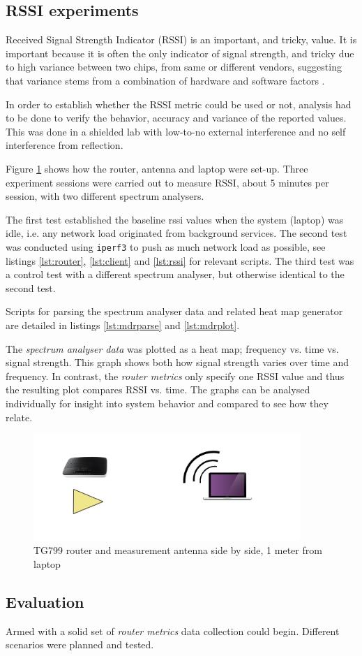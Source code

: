 \subsection{RSSI experiments}

Received Signal Strength Indicator (RSSI) is an important, and tricky, value. It
is important because it is often the only indicator of signal strength, and
tricky due to high variance between two chips, from same or different vendors,
suggesting that variance stems from a combination of hardware and software
factors \cite{lui}.

In order to establish whether the RSSI metric could be used or not, analysis had
to be done to verify the behavior, accuracy and variance of the reported values.
This was done in a shielded lab with low-to-no external interference and no self
interference from reflection.

Figure \ref{fig:rssi_setup} shows how the router, antenna and laptop were
set-up. Three experiment sessions were carried out to measure RSSI, about 5
minutes per session, with two different spectrum analysers.

The first test established the baseline rssi values when the system (laptop) was
idle, i.e. any network load originated from background services. The second test
was conducted using \texttt{iperf3} to push as much network load as possible,
see listings \ref{lst:router}, \ref{lst:client} and \ref{lst:rssi} for relevant
scripts. The third test was a control test with a different spectrum analyser,
but otherwise identical to the second test.

Scripts for parsing the spectrum analyser data and related heat map generator
are detailed in listings \ref{lst:mdrparse} and \ref{lst:mdrplot}.

The \emph{spectrum analyser data} was plotted as a heat map; frequency vs. time
vs. signal strength. This graph shows both how signal strength varies over time
and frequency. In contrast, the \emph{router metrics} only specify one RSSI
value and thus the resulting plot compares RSSI vs. time. The graphs can be
analysed individually for insight into system behavior and compared to see how
they relate.

\begin{figure}
\center
\includegraphics[width=0.9\textwidth]{images/rssi_setup.png}
\caption{TG799 router and measurement antenna side by side, 1 meter from laptop}
\label{fig:rssi_setup}
\end{figure}

\subsection{Evaluation}

Armed with a solid set of \emph{router metrics} data collection could begin.
Different scenarios were planned and tested.